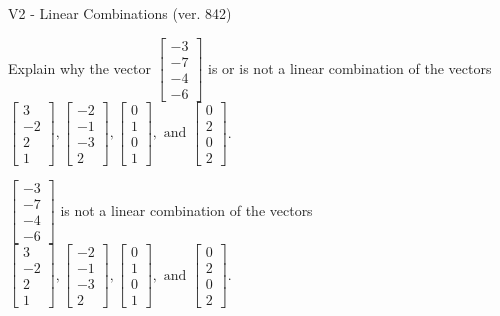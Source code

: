 \begin{exercise}
  \begin{exerciseTitle}V2 - Linear Combinations (ver. 842)\end{exerciseTitle}
  \begin{exerciseStatement}
    Explain why the vector \(\left[\begin{array}{c}
-3 \\
-7 \\
-4 \\
-6
\end{array}\right]\)  is or is not a linear 
	combination of the vectors \(\left[\begin{array}{c}
3 \\
-2 \\
2 \\
1
\end{array}\right] , \left[\begin{array}{c}
-2 \\
-1 \\
-3 \\
2
\end{array}\right] , \left[\begin{array}{c}
0 \\
1 \\
0 \\
1
\end{array}\right] , \text{ and } \left[\begin{array}{c}
0 \\
2 \\
0 \\
2
\end{array}\right]\).
	


  \end{exerciseStatement}
  \begin{exerciseAnswer}
   \(\left[\begin{array}{c}
-3 \\
-7 \\
-4 \\
-6
\end{array}\right]\) 
  	 is not  
	a linear combination of the vectors \(\left[\begin{array}{c}
3 \\
-2 \\
2 \\
1
\end{array}\right] , \left[\begin{array}{c}
-2 \\
-1 \\
-3 \\
2
\end{array}\right] , \left[\begin{array}{c}
0 \\
1 \\
0 \\
1
\end{array}\right] , \text{ and } \left[\begin{array}{c}
0 \\
2 \\
0 \\
2
\end{array}\right]\).


\end{exerciseAnswer}
\end{exercise}
